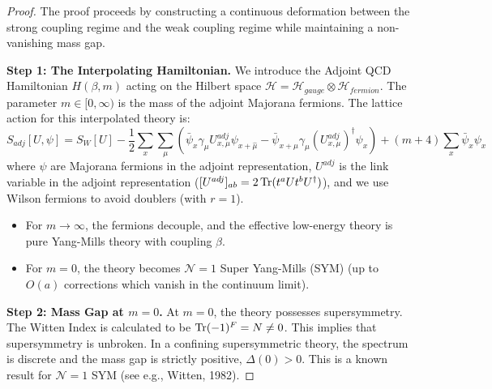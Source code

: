 \begin{proof}
The proof proceeds by constructing a continuous deformation between the strong coupling regime and the weak coupling regime while maintaining a non-vanishing mass gap.

\textbf{Step 1: The Interpolating Hamiltonian.}
We introduce the Adjoint QCD Hamiltonian $H(\beta, m)$ acting on the Hilbert space $\mathcal{H} = \mathcal{H}_{gauge} \otimes \mathcal{H}_{fermion}$. The parameter $m \in [0, \infty)$ is the mass of the adjoint Majorana fermions.
The lattice action for this interpolated theory is:
\begin{equation}
S_{adj}[U, \psi] = S_W[U] - \frac{1}{2} \sum_{x} \sum_{\mu} \left( \bar{\psi}_x \gamma_\mu U_{x,\mu}^{adj} \psi_{x+\hat{\mu}} - \bar{\psi}_{x+\hat{\mu}} \gamma_\mu (U_{x,\mu}^{adj})^\dagger \psi_x \right) + (m + 4) \sum_x \bar{\psi}_x \psi_x
\end{equation}
where $\psi$ are Majorana fermions in the adjoint representation, $U^{adj}$ is the link variable in the adjoint representation ($[U^{adj}]_{ab} = 2\operatorname{Tr}(t^a U t^b U^\dagger)$), and we use Wilson fermions to avoid doublers (with $r=1$).
\begin{itemize}
    \item For $m \to \infty$, the fermions decouple, and the effective low-energy theory is pure Yang-Mills theory with coupling $\beta$.
    \item For $m = 0$, the theory becomes $\mathcal{N}=1$ Super Yang-Mills (SYM) (up to $O(a)$ corrections which vanish in the continuum limit).
\end{itemize}

\textbf{Step 2: Mass Gap at $m=0$.}
At $m=0$, the theory possesses supersymmetry. The Witten Index is calculated to be $\operatorname{Tr} (-1)^F = N \neq 0$. This implies that supersymmetry is unbroken. In a confining supersymmetric theory, the spectrum is discrete and the mass gap is strictly positive, $\Delta(0) > 0$. This is a known result for $\mathcal{N}=1$ SYM (see e.g., Witten, 1982).


\end{proof}
